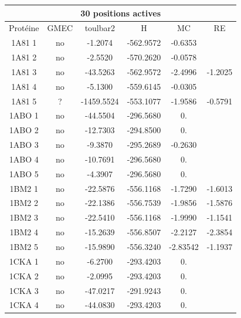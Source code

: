 \begin{table}[h]
      \centering

      \begin{tabular}{|c|c|c|c|c|c|}


        \hline
        \multicolumn{6}{|c|}{30 positions actives} \\
        \hline
        Protéine & GMEC & toulbar2 & H & MC & RE \\
        \hline
        1A81 1 & no & -1.2074    &    -562.9572 & -0.6353 &  \\          
        1A81 2 & no & -2.5520    &    -570.2620 & -0.0578 & \\          
        1A81 3 & no & -43.5263   &    -562.9572 & -2.4996 & -1.2025 \\         
        1A81 4 & no & -5.1300    &    -559.6145 & -0.0305 & \\          
        1A81 5 & ?  & -1459.5524 &   -553.1077 & -1.9586 & -0.5791\\         
        1ABO 1 & no & -44.5504   &    -296.5680 & 0. & \\                   
        1ABO 2 & no & -12.7303   &    -294.8500 & 0. & \\                   
        1ABO 3 & no & -9.3870    &    -295.2689 & -0.2630 & \\          
        1ABO 4 & no & -10.7691   &    -296.5680 & 0. & \\                   
        1ABO 5 & no & -4.3907    &    -296.5680 & 0. & \\                    
        1BM2 1 & no & -22.5876   &    -556.1168 & -1.7290 & -1.6013 \\         
        1BM2 2 & no & -22.1386   &    -556.7539 & -1.9856 & -1.5876 \\     
        1BM2 3 & no & -22.5410   &    -556.1168 & -1.9990 & -1.1541 \\
        1BM2 4 & no & -15.2639   &    -556.8507 & -2.2127 & -2.3854 \\         
        1BM2 5 & no & -15.9890   &    -556.3240 & -2.83542 & -1.1937 \\        
        1CKA 1 & no & -6.2700    &    -293.4203 & 0. & \\                    
        1CKA 2 & no & -2.0995    &    -293.4203 & 0. & \\                    
        1CKA 3 & no & -47.0217   &    -291.9243 & 0. & \\                   
        1CKA 4 & no & -44.0830   &    -293.4203 & 0. & \\                   

\end{tabular}
\end{table}
